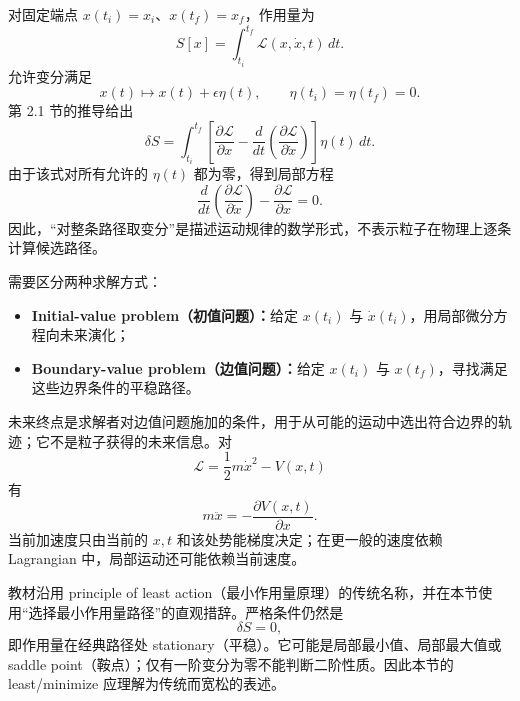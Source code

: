 对固定端点 $x(t_i)=x_i$、$x(t_f)=x_f$，作用量为
\begin{equation}
  S[x]=\int_{t_i}^{t_f}
  \mathcal L(x,\dot x,t)\,dt.
  \label{eq:QM-C02-S04-action}
\end{equation}
允许变分满足
\[
  x(t)\mapsto x(t)+\epsilon\eta(t),
  \qquad
  \eta(t_i)=\eta(t_f)=0.
\]
第 2.1 节的推导给出
\begin{equation}
  \delta S
  =\int_{t_i}^{t_f}
  \left[
    \frac{\partial\mathcal L}{\partial x}
    -\frac{d}{dt}
      \left(\frac{\partial\mathcal L}{\partial\dot x}\right)
  \right]\eta(t)\,dt.
  \label{eq:QM-C02-S04-first-variation}
\end{equation}
由于该式对所有允许的 $\eta(t)$ 都为零，得到局部方程
\begin{equation}
  \boxed{
  \frac{d}{dt}
  \left(\frac{\partial\mathcal L}{\partial\dot x}\right)
  -\frac{\partial\mathcal L}{\partial x}=0.}
  \label{eq:QM-C02-S04-euler-lagrange}
\end{equation}
因此，“对整条路径取变分”是描述运动规律的数学形式，不表示粒子在物理上逐条计算候选路径。

需要区分两种求解方式：
\begin{itemize}[leftmargin=*]
  \item \textbf{Initial-value problem（初值问题）：}给定 $x(t_i)$ 与 $\dot x(t_i)$，用局部微分方程向未来演化；
  \item \textbf{Boundary-value problem（边值问题）：}给定 $x(t_i)$ 与 $x(t_f)$，寻找满足这些边界条件的平稳路径。
\end{itemize}
未来终点是求解者对边值问题施加的条件，用于从可能的运动中选出符合边界的轨迹；它不是粒子获得的未来信息。对
\begin{equation}
  \mathcal L=\frac12m\dot x^2-V(x,t)
  \label{eq:QM-C02-S04-standard-lagrangian}
\end{equation}
有
\begin{equation}
  \boxed{
  m\ddot x=-\frac{\partial V(x,t)}{\partial x}.}
  \label{eq:QM-C02-S04-local-newton}
\end{equation}
当前加速度只由当前的 $x,t$ 和该处势能梯度决定；在更一般的速度依赖 Lagrangian 中，局部运动还可能依赖当前速度。


教材沿用 principle of least action（最小作用量原理）的传统名称，并在本节使用“选择最小作用量路径”的直观措辞。严格条件仍然是
\begin{equation}
  \boxed{\delta S=0,}
  \label{eq:QM-C02-S04-stationary-action}
\end{equation}
即作用量在经典路径处 stationary（平稳）。它可能是局部最小值、局部最大值或 saddle point（鞍点）；仅有一阶变分为零不能判断二阶性质。因此本节的 least/minimize 应理解为传统而宽松的表述。

